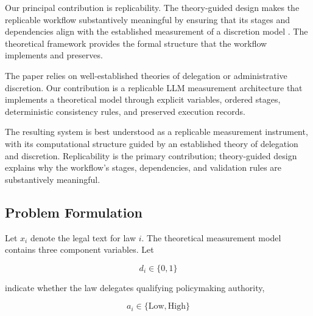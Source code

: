 
Our principal contribution is replicability. The theory-guided design
makes the replicable workflow substantively meaningful by ensuring
that its stages and dependencies align with the established
measurement of a discretion model \citep{epstein1999delegating}. 
The theoretical framework provides the formal structure that the workflow implements and preserves.



The paper relies on well-established theories of delegation or
administrative discretion. Our contribution is a replicable LLM
measurement architecture that implements a theoretical model through
explicit variables, ordered stages, deterministic consistency rules,
and preserved execution records.



The resulting system is best understood as a replicable measurement
instrument, with its computational structure guided by an established
theory of delegation and discretion. Replicability is the primary
contribution; theory-guided design explains why the workflow's stages,
dependencies, and validation rules are substantively meaningful.



\subsection{Problem Formulation}

Let \(x_i\) denote the legal text for law \(i\). The theoretical
measurement model contains three component variables. Let

\[
d_i \in \{0,1\}
\]

indicate whether the law delegates qualifying policymaking authority,

\[
a_i \in \{\mathrm{Low},\mathrm{High}\}
\]

